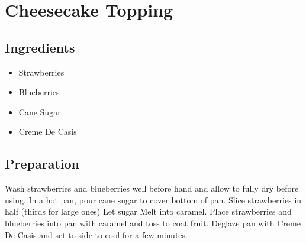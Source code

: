 \thispagestyle{fancy}
\section{Cheesecake Topping}
\AddToShipoutPicture*{\CheesecakeTopping}

\subsection*{Ingredients}
\begin{multicols}{3}
	\begin{itemize}
		\item Strawberries
		\item Blueberries
		\item Cane Sugar
		\item Creme De Casis
	\end{itemize}
\end{multicols}

\subsection*{Preparation}

Wash strawberries and blueberries well before hand and allow to fully dry before using. In a hot pan, pour cane sugar to cover bottom of pan. Slice strawberries in half (thirds for large ones) Let sugar Melt into caramel. Place strawberries and blueberries into pan with caramel and toss to coat fruit. Deglaze pan with Creme De Casis and set to side to cool for a few minutes.